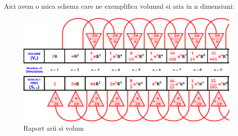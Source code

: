 \documentclass[12pt]{caltech_thesis}
\begin{document}
\newpage
Aici avem o mica schema care ne exemplifica volumul si aria in n dimensiuni:

\begin{figure}[hbt!]
\centering
\includegraphics[width=1\textwidth]{volume_area.png}
\caption{Raport arii si volum}\label{fig:logo}
\end{figure}



\printbibliography


\end{document}
